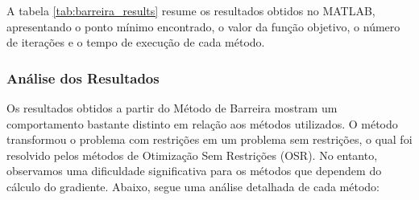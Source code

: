 \documentclass[a4paper, 12pt]{article}
\begin{document}
A tabela \ref{tab:barreira_results} resume os resultados obtidos no MATLAB, apresentando o ponto mínimo encontrado, o valor da função objetivo, o número de iterações e o tempo de execução de cada método.

\begin{table}[h!]
    \centering
    \caption{Resultados dos Métodos OSR para o Método de Barreira}
    \label{tab:barreira_results}
\end{table}

\subsubsection{Análise dos Resultados}

Os resultados obtidos a partir do Método de Barreira mostram um comportamento bastante distinto em relação aos métodos utilizados. O método transformou o problema com restrições em um problema sem restrições, o qual foi resolvido pelos métodos de Otimização Sem Restrições (OSR). No entanto, observamos uma dificuldade significativa para os métodos que dependem do cálculo do gradiente. Abaixo, segue uma análise detalhada de cada método:
\end{document}
